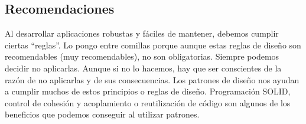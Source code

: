 \documentclass[twoside,twocolumn]{article}
\begin{document}
\begin{itemize}
\section{Recomendaciones}
\begin{itemize}
	Al desarrollar aplicaciones robustas y fáciles de mantener, debemos cumplir ciertas “reglas”. Lo pongo entre comillas porque aunque estas reglas de diseño son recomendables (muy recomendables), no son obligatorias. Siempre podemos decidir no aplicarlas. Aunque si no lo hacemos, hay que ser conscientes de la razón de no aplicarlas y de sus consecuencias.
Los patrones de diseño nos ayudan a cumplir muchos de estos principios o reglas de diseño. Programación SOLID, control de cohesión y acoplamiento o reutilización de código son algunos de los beneficios que podemos conseguir al utilizar patrones.

\end{itemize}




\end{itemize}
\end{document}
